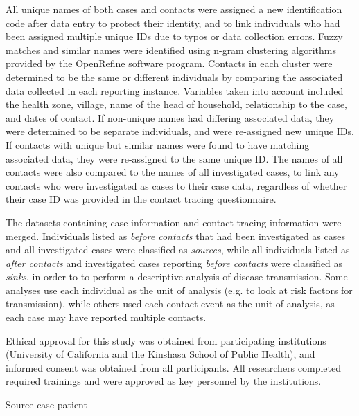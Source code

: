 All unique names of both cases and contacts were assigned a new identification code after data entry to protect their identity, and to link individuals who had been assigned multiple unique IDs due to typos or data collection errors. Fuzzy matches and similar names were identified using n-gram clustering algorithms provided by the OpenRefine software program. Contacts in each cluster were determined to be the same or different individuals by comparing the associated data collected in each reporting instance. Variables taken into account included the health zone, village, name of the head of household, relationship to the case, and dates of contact. If non-unique names had differing associated data, they were determined to be separate individuals, and were re-assigned new unique IDs. If contacts with unique but similar names were found to have matching associated data, they were re-assigned to the same unique ID. The names of all contacts were also compared to the names of all investigated cases, to link any contacts who were investigated as cases to their case data, regardless of whether their case ID was provided in the contact tracing questionnaire.

The datasets containing case information and contact tracing information were merged. Individuals listed as \textit{before contacts} that had been investigated as cases and all investigated cases were classified as \textit{sources}, while all individuals listed as \textit{after contacts} and investigated cases reporting \textit{before contacts} were classified as \textit{sinks}, in order to to perform a descriptive analysis of disease transmission. Some analyses use each individual as the unit of analysis (e.g. to look at risk factors for transmission), while others used each contact event as the unit of analysis, as each case may have reported multiple contacts. 

Ethical approval for this study was obtained from participating institutions (University of California and the Kinshasa School of Public Health), and informed consent was obtained from all participants. All researchers completed required trainings and were approved as key personnel by the institutions. 

\subtitle{Definitions}
Source case-patient \cite{Dixon2015}



